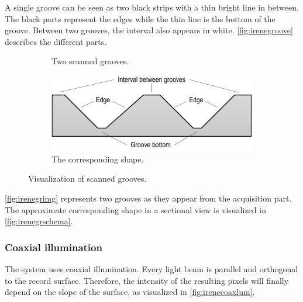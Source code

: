 A single groove can be seen as two black strips with a thin bright line in between. The black parts represent the edges while the thin line is the bottom of the groove. Between two grooves, the interval also appears in white. \autoref{fig:irenegroove} describes the different parts.

\begin{figure}[!ht]
\centering
    \begin{subfigure}[t]{0.29\textwidth}
    \centering
    \caption{Two scanned grooves.}
    \label{fig:irenegrimg}
    \end{subfigure}
    \begin{subfigure}[t]{0.7\textwidth}
    \centering
    \includegraphics[width=9.5cm]{images/irene-grooves-schema}
    \caption{The corresponding shape.}
    \label{fig:irenegrschema}
    \end{subfigure}
    \caption{Visualization of scanned grooves.}
    \label{fig:irenegroove}
\end{figure}

\autoref{fig:irenegrimg} represents two grooves as they appear from the acquisition part. The approximate corresponding shape in a sectional view is visualized in \autoref{fig:irenegrschema}.

\subsubsection{Coaxial illumination}

The system uses coaxial illumination. Every light beam is parallel and orthogonal to the record surface. Therefore, the intensity of the resulting pixels will finally depend on the slope of the surface, as visualized in \autoref{fig:irenecoaxlum}.

